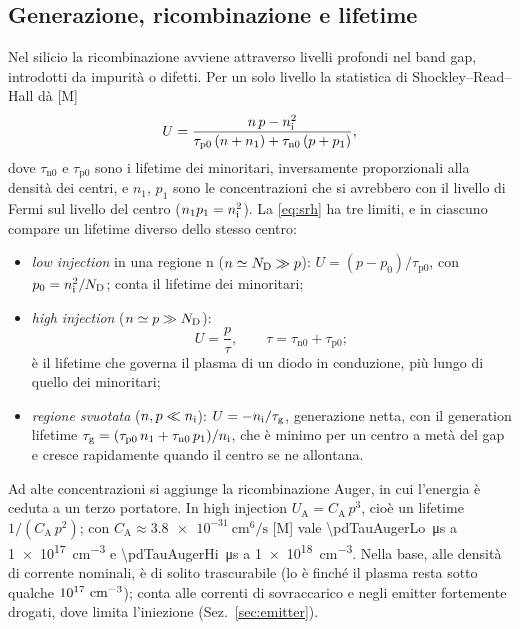 \documentclass[10pt,a4paper]{scrartcl}
\let\newcommand\pdvaluedefine
\newcommand{\ND}{N_\mathrm{D}}
\newcommand{\nint}{n_\mathrm{i}}
\newcommand{\cmc}{\si{\centi\metre^{-3}}}
\begin{document}
\subsection{Generazione, ricombinazione e lifetime}
\label{sec:lifetime}
Nel silicio la ricombinazione avviene attraverso livelli profondi nel band gap, introdotti da impurità o difetti. Per un solo livello la statistica di Shockley--Read--Hall dà [M] \cite{sze}
\begin{equation}
U = \frac{n\,p - \nint^2}{\tau_\mathrm{p0}\,(n + n_1) + \tau_\mathrm{n0}\,(p + p_1)} ,
\label{eq:srh}
\end{equation}
dove $\tau_\mathrm{n0}$ e $\tau_\mathrm{p0}$ sono i lifetime dei minoritari, inversamente proporzionali alla densità dei centri, e $n_1$, $p_1$ sono le concentrazioni che si avrebbero con il livello di Fermi sul livello del centro ($n_1 p_1 = \nint^2$). La \eqref{eq:srh} ha tre limiti, e in ciascuno compare un lifetime diverso dello stesso centro:
\begin{itemize}
\item \emph{low injection} in una regione n ($n \simeq \ND \gg p$): $U = (p - p_0)/\tau_\mathrm{p0}$, con $p_0 = \nint^2/\ND$; conta il lifetime dei minoritari;
\item \emph{high injection} ($n \simeq p \gg \ND$):
\begin{equation}
U = \frac{p}{\tau} , \qquad \tau = \tau_\mathrm{n0} + \tau_\mathrm{p0} ;
\label{eq:tauhl}
\end{equation}
è il lifetime che governa il plasma di un diodo in conduzione, più lungo di quello dei minoritari;
\item \emph{regione svuotata} ($n, p \ll \nint$): $U = -\nint/\tau_\mathrm{g}$, generazione netta, con il generation lifetime $\tau_\mathrm{g} = (\tau_\mathrm{p0}\,n_1 + \tau_\mathrm{n0}\,p_1)/\nint$, che è minimo per un centro a metà del gap e cresce rapidamente quando il centro se ne allontana.
\end{itemize}
Ad alte concentrazioni si aggiunge la ricombinazione Auger, in cui l'energia è ceduta a un terzo portatore. In high injection $U_\mathrm{A} = C_\mathrm{A}\,p^3$, cioè un lifetime $1/(C_\mathrm{A}\,p^2)$; con $C_\mathrm{A} \approx \SI{3.8e-31}{\centi\metre^6\per\second}$ [M] \cite{lutz} vale \SI{\pdTauAugerLo}{\micro\second} a \SI{1e17}{\centi\metre^{-3}} e \SI{\pdTauAugerHi}{\micro\second} a \SI{1e18}{\centi\metre^{-3}}. Nella base, alle densità di corrente nominali, è di solito trascurabile (lo è finché il plasma resta sotto qualche $10^{17}\ \cmc$); conta alle correnti di sovraccarico e negli emitter fortemente drogati, dove limita l'iniezione (Sez.~\ref{sec:emitter}).
\end{document}
